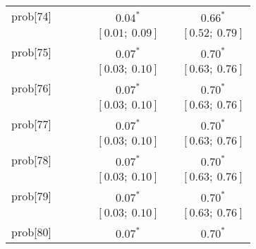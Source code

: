 \begin{table}
\begin{center}
\begin{tabular}{l c c c c c c }
prob[74]  &                           &                           &                           & $0.04^{*}$              &                           & $0.66^{*}$            \\
          &                           &                           &                           & $[0.01;\ 0.09]$         &                           & $[0.52;\ 0.79]$       \\
prob[75]  &                           &                           &                           & $0.07^{*}$              &                           & $0.70^{*}$            \\
          &                           &                           &                           & $[0.03;\ 0.10]$         &                           & $[0.63;\ 0.76]$       \\
prob[76]  &                           &                           &                           & $0.07^{*}$              &                           & $0.70^{*}$            \\
          &                           &                           &                           & $[0.03;\ 0.10]$         &                           & $[0.63;\ 0.76]$       \\
prob[77]  &                           &                           &                           & $0.07^{*}$              &                           & $0.70^{*}$            \\
          &                           &                           &                           & $[0.03;\ 0.10]$         &                           & $[0.63;\ 0.76]$       \\
prob[78]  &                           &                           &                           & $0.07^{*}$              &                           & $0.70^{*}$            \\
          &                           &                           &                           & $[0.03;\ 0.10]$         &                           & $[0.63;\ 0.76]$       \\
prob[79]  &                           &                           &                           & $0.07^{*}$              &                           & $0.70^{*}$            \\
          &                           &                           &                           & $[0.03;\ 0.10]$         &                           & $[0.63;\ 0.76]$       \\
prob[80]  &                           &                           &                           & $0.07^{*}$              &                           & $0.70^{*}$            \\

\end{tabular}
\end{center}
\end{table}

